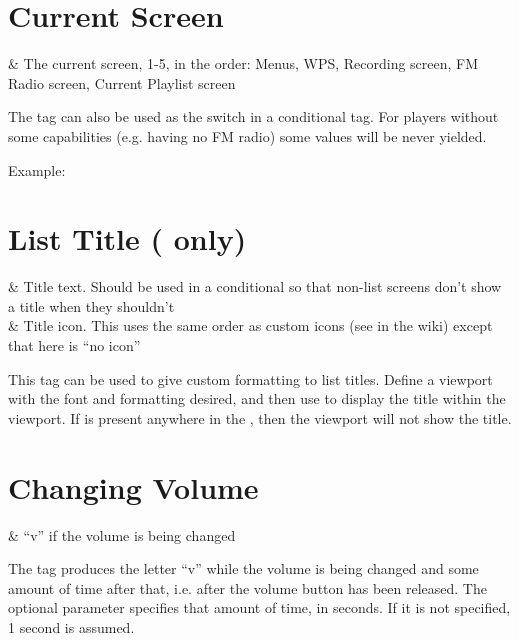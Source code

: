 \section{Current Screen}
  \begin{tagmap}
     & The current screen, 1-5, in the order:
                Menus, WPS, Recording screen, FM Radio screen, Current Playlist screen\\
  \end{tagmap}
The tag can also be used as the switch in a conditional tag. For players without
some capabilities (e.g. having no FM radio) some values will be never yielded.

Example: 

\section{List Title ( only)}
  \begin{tagmap}
     & Title text. Should be used in a conditional so that non-list
      screens don't show a title when they shouldn't\\
     & Title icon. This uses the same order as custom icons (see
       in the wiki) except that here  is ``no
      icon''\\
  \end{tagmap}

  This tag can be used to give custom formatting to list titles.
  Define a viewport with the font and formatting desired, and then use
   to display the title within the
  viewport.  If  is present anywhere in the , then the
   viewport will not show the title.

\section{Changing Volume}
  \begin{tagmap}
     & ``v'' if the volume is being changed\\
  \end{tagmap}

The tag produces the letter ``v'' while the volume is being changed and some
amount of time after that, i.e. after the volume button has been released. The
optional parameter  specifies that amount of time, in seconds. If it
is not specified, 1 second is assumed.

